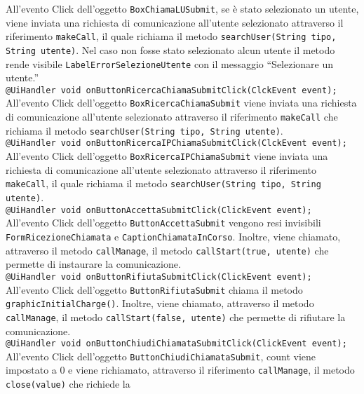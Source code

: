{\begin{sloppypar}
{\begin{itemize}
\begin{itemize}
				All'evento Click dell'oggetto \texttt{BoxChiamaLUSubmit}, se è stato selezionato un utente, viene inviata una richiesta di comunicazione all’utente selezionato attraverso il 
				riferimento \texttt{makeCall}, il quale richiama il metodo \texttt{searchUser(String tipo, String utente)}. 
				Nel caso non fosse stato selezionato alcun utente il metodo rende visibile \texttt{LabelErrorSelezioneUtente} 
				con il messaggio “Selezionare un utente.”\\
				\texttt{@UiHandler void onButtonRicercaChiamaSubmitClick(ClckEvent event);}\\
				All'evento Click dell'oggetto \texttt{BoxRicercaChiamaSubmit} viene inviata una 
				richiesta di comunicazione all’utente selezionato attraverso il riferimento \texttt{makeCall} che richiama 
				il metodo \texttt{searchUser(String tipo, String utente)}.\\
				\texttt{@UiHandler void onButtonRicercaIPChiamaSubmitClick(ClckEvent event);}\\
				All'evento Click dell'oggetto \texttt{BoxRicercaIPChiamaSubmit} viene inviata 
				una richiesta di comunicazione all’utente selezionato attraverso il riferimento \texttt{makeCall}, il quale 
				richiama il metodo \texttt{searchUser(String tipo, String utente)}.\\
				\texttt{@UiHandler void onButtonAccettaSubmitClick(ClickEvent event);}\\
				All'evento Click dell'oggetto \texttt{ButtonAccettaSubmit} vengono resi invisibili \texttt{FormRicezioneChiamata} 
				e \texttt{CaptionChiamataInCorso}. Inoltre, viene chiamato, attraverso il metodo \texttt{callManage}, il 
				metodo \texttt{callStart(true, utente)} che permette di instaurare la comunicazione.\\
				\texttt{@UiHandler void onButtonRifiutaSubmitClick(ClickEvent event);}\\
				All'evento Click dell'oggetto \texttt{ButtonRifiutaSubmit} chiama il metodo \texttt{graphicInitialCharge()}. 
				Inoltre, viene chiamato, attraverso il metodo \texttt{callManage}, il metodo \texttt{callStart(false, utente)} 
				che permette di rifiutare la comunicazione.\\
				\texttt{@UiHandler void onButtonChiudiChiamataSubmitClick(ClickEvent event);}\\
				All'evento Click dell'oggetto \texttt{ButtonChiudiChiamataSubmit}, count viene impostato a 0 e viene 
				richiamato, attraverso il riferimento \texttt{callManage}, il metodo \texttt{close(value)} che richiede la 

\end{itemize}
\end{itemize}}
\end{sloppypar}}
